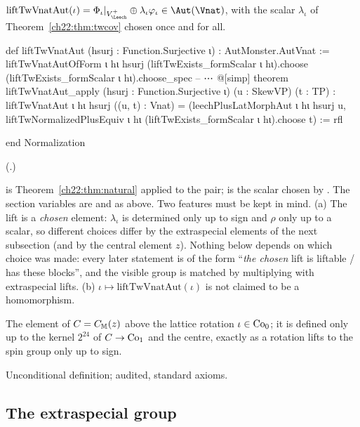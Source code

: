 \begin{definition}\label{ch22:def:liftTw}
$\mathrm{liftTwVnatAut}(\iota)=\Phi_\iota|_{V_\Leech^+}\oplus \lambda_\iota\varphi_\iota\in\Aut(\Vnat)$, with the scalar $\lambda_\iota$ of
Theorem~\ref{ch22:thm:twcov} chosen once and for all.
\end{definition}
\begin{leancode}
def liftTwVnatAut (hsurj : Function.Surjective ι) : AutMonster.AutVnat :=
  liftTwVnatAutOfForm ι hι hsurj (liftTwExists_formScalar ι hι).choose
    (liftTwExists_formScalar ι hι).choose_spec
-- ⋯
@[simp] theorem liftTwVnatAut_apply (hsurj : Function.Surjective ι)
    (u : SkewVP) (t : TP) :
    liftTwVnatAut ι hι hsurj ((u, t) : Vnat) =
      (leechPlusLatMorphAut ι hι hsurj u,
        liftTwNormalizedPlusEquiv ι hι (liftTwExists_formScalar ι hι).choose t) := rfl

end Normalization
\end{leancode}
(.)
\begin{dictionary}
 is Theorem~\ref{ch22:thm:natural} applied to the pair;  is the scalar
chosen by .  The section variables are  and  as above.  Two features must be
kept in mind.  (a) The lift is a \emph{chosen} element: $\lambda_\iota$ is determined only up to sign and $\rho$ only up to a
scalar, so different choices differ by the extraspecial elements of the next subsection (and by the central element
$z$).  Nothing below depends on which choice was made: every later statement is of the form ``\emph{the chosen} lift
is liftable / has these blocks'', and the visible group is matched by multiplying with extraspecial lifts.  (b)
$\iota\mapsto\mathrm{liftTwVnatAut}(\iota)$ is not claimed to be a homomorphism.
\end{dictionary}
\begin{physics}
The element of $C=C_{\mathbb{M}}(z)$ above the lattice rotation $\iota\in\mathrm{Co}_0$; it is defined only up to the
kernel $2^{24}$ of $C\to\mathrm{Co}_1$ and the centre, exactly as a rotation lifts to the spin group only up to sign.
\end{physics}
\begin{status}Unconditional definition;  audited, standard axioms.\end{status}


\subsection{The extraspecial group}

